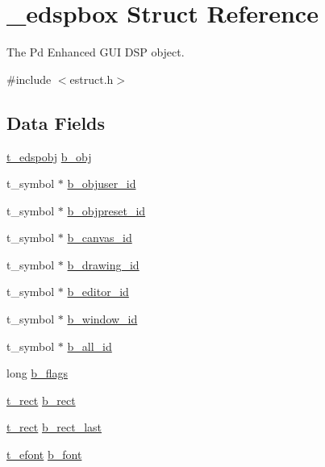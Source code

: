\hypertarget{struct__edspbox}{\section{\-\_\-edspbox Struct Reference}
\label{struct__edspbox}
}


The Pd Enhanced G\-U\-I D\-S\-P object.  




{\ttfamily \#include $<$estruct.\-h$>$}

\subsection*{Data Fields}
\begin{DoxyCompactItemize}
\item 
\hyperlink{struct__edspobj}{t\-\_\-edspobj} \hyperlink{struct__edspbox_a8a991907db2d274664740c5f19569148}{b\-\_\-obj}
\item 
t\-\_\-symbol $\ast$ \hyperlink{struct__edspbox_ae324f65e10196cc7e166652e8d7d394d}{b\-\_\-objuser\-\_\-id}
\item 
t\-\_\-symbol $\ast$ \hyperlink{struct__edspbox_adc377263d208d1051f4a0997868b1155}{b\-\_\-objpreset\-\_\-id}
\item 
t\-\_\-symbol $\ast$ \hyperlink{struct__edspbox_ac0251c6969a1032f8f50d076e909fb3e}{b\-\_\-canvas\-\_\-id}
\item 
t\-\_\-symbol $\ast$ \hyperlink{struct__edspbox_a153f9c9929d722ecb29217f3fb0914c9}{b\-\_\-drawing\-\_\-id}
\item 
t\-\_\-symbol $\ast$ \hyperlink{struct__edspbox_adf8c80c6ea45ad810c754984d98830ff}{b\-\_\-editor\-\_\-id}
\item 
t\-\_\-symbol $\ast$ \hyperlink{struct__edspbox_a7033df943e798c68e3a6117785c2d79e}{b\-\_\-window\-\_\-id}
\item 
t\-\_\-symbol $\ast$ \hyperlink{struct__edspbox_a0f63dcf604135dd4fbfbf43eaed53c1a}{b\-\_\-all\-\_\-id}
\item 
long \hyperlink{struct__edspbox_abdae234dbd983dfbfb0592858c4ff026}{b\-\_\-flags}
\item 
\hyperlink{struct__rect}{t\-\_\-rect} \hyperlink{struct__edspbox_abc70ff46c135ee9f377a038bbc05a33e}{b\-\_\-rect}
\item 
\hyperlink{struct__rect}{t\-\_\-rect} \hyperlink{struct__edspbox_a2a0a15d3bc005cd4f815088b230b5ebd}{b\-\_\-rect\-\_\-last}
\item 
\hyperlink{struct__efont}{t\-\_\-efont} \hyperlink{struct__edspbox_a4071412a20456f5fcafe2a91cdef11c3}{b\-\_\-font}

\end{DoxyCompactItemize}
